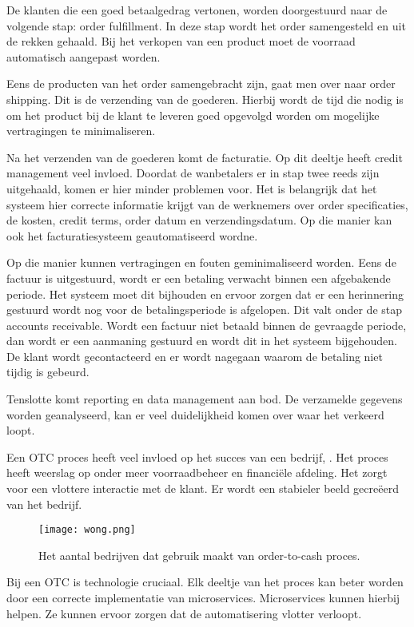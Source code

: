 De klanten die een goed betaalgedrag vertonen, worden doorgestuurd naar de volgende stap: order fulfillment. In deze stap wordt het order samengesteld en uit de rekken gehaald. Bij het verkopen van een product moet de voorraad automatisch aangepast worden. 

Eens de producten van het order samengebracht zijn, gaat  men  over naar order shipping. Dit is de verzending van de goederen. Hierbij wordt de tijd  die nodig is om het product bij de klant te leveren goed opgevolgd worden om mogelijke vertragingen te minimaliseren.  

Na het verzenden van de goederen komt de facturatie. Op dit deeltje heeft credit management veel invloed. Doordat de wanbetalers er in stap twee reeds zijn uitgehaald, komen er hier minder problemen voor. Het is belangrijk dat het systeem hier correcte informatie krijgt van de werknemers over order specificaties, de kosten, credit terms, order datum en verzendingsdatum. Op die manier kan ook het facturatiesysteem geautomatiseerd wordne.

 Op die manier kunnen vertragingen en fouten geminimaliseerd worden. Eens de factuur is uitgestuurd, wordt er een betaling verwacht binnen een afgebakende periode. Het systeem moet dit bijhouden en ervoor zorgen dat er een herinnering gestuurd wordt nog voor de betalingsperiode is afgelopen. Dit valt onder de stap accounts receivable. 
 Wordt een factuur niet betaald binnen de gevraagde periode, dan wordt er een aanmaning gestuurd en wordt dit in het systeem bijgehouden. De klant wordt gecontacteerd en er wordt nagegaan waarom de betaling niet tijdig is gebeurd.
 
Tenslotte komt reporting en data management aan bod. De verzamelde gegevens worden geanalyseerd, kan er veel duidelijkheid komen over waar het verkeerd loopt.

Een OTC proces heeft veel invloed op het succes van een bedrijf, \textcite{Wong2018}. Het proces heeft weerslag op onder meer voorraadbeheer en financiële afdeling. Het zorgt voor een vlottere interactie met de klant. Er wordt een stabieler beeld gecreëerd van het bedrijf. 
 
\begin{figure}[h!]
	\texttt{[image: wong.png]}
	\caption{Het aantal bedrijven dat gebruik maakt van order-to-cash proces. \textcite{Wong2018}}
	\centering
\end{figure}
  
Bij een OTC is technologie cruciaal. Elk deeltje van het proces kan beter worden door een correcte implementatie van microservices. Microservices kunnen hierbij helpen. Ze kunnen ervoor zorgen dat de automatisering vlotter verloopt.

